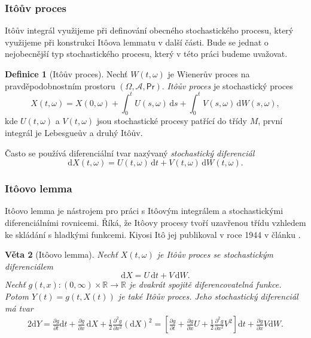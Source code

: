 \documentclass[a4paper,12pt]{report}
\newtheorem{veta}{Věta}
\theoremstyle{definition} \newtheorem{definice}[veta]{Definice}
\theoremstyle{remark}
\begin{document}
\subsubsection{It\^oův proces}

It\^oův integrál využijeme při definování obecného stochastického procesu, který využijeme při konstrukci It\^oova lemmatu v další části.
Bude se jednat o nejobecnější typ stochastického procesu, který v této práci budeme uvažovat.

\begin{definice}[It\^oův proces]
Nechť $W(t,\omega)$ je Wienerův proces na pravděpodobnostním prostoru $(\Omega,\mathcal{A},\mathsf{Pr})$.
\textit{It\^oův proces} je stochastický proces
$$X(t,\omega)=X(0,\omega)+\int_0^tU(s,\omega)\,\mathrm{d}s+\int_0^tV(s,\omega)\,\mathrm{d}W(s,\omega),$$
kde $U(t,\omega)$ a $V(t,\omega)$ jsou stochastické procesy patřící do třídy $M$,
první integrál je Lebesgueův a druhý It\^oův. %

Často se používá diferenciální tvar nazývaný \textit{stochastický diferenciál}
$$\mathrm{d}X(t,\omega)=U(t,\omega)\,\mathrm{d}t+V(t,\omega)\,\mathrm{d}W(t,\omega).$$
\end{definice}


\subsubsection{It\^oovo lemma}
It\^oovo lemma je nástrojem pro práci s It\^oovým integrálem a stochastickými diferenciálními rovnicemi.
Říká, že It\^oovy procesy tvoří uzavřenou třídu vzhledem ke skládání s hladkými funkcemi.
Kiyosi It\^o jej publikoval v roce 1944 v článku \cite{ito1944}.
\begin{veta}[It\^oovo lemma]\label{ito_lemma}
Nechť $X(t,\omega)$ je It\^oův proces se stochastickým diferenciálem
$$\mathrm{d}X=U\,\mathrm{d}t+V\,\mathrm{d}W.$$
Nechť $g(t,x):(0,\infty)\times\mathbb R\to\mathbb R$ je dvakrát spojitě diferencovatelná funkce.
Potom $Y(t)=g(t,X(t))$ je také It\^oův proces.
Jeho stochastický diferenciál má tvar
\begin{alignat*}{2}
\mathrm{d}Y=\frac{\partial g}{\partial t}\mathrm{d}t+\frac{\partial g}{\partial x}\,\mathrm{d}X+\frac12\frac{\partial^2 g}{\partial x^2}(\mathrm{d}X)^2=\left[\frac{\partial g}{\partial t}+\frac{\partial g}{\partial x}U+\frac12\frac{\partial^2 g}{\partial x^2}V^2\right]\mathrm{d}t+\frac{\partial g}{\partial x}V\mathrm{d}W.
\end{alignat*}
\end{veta}
\end{document}
